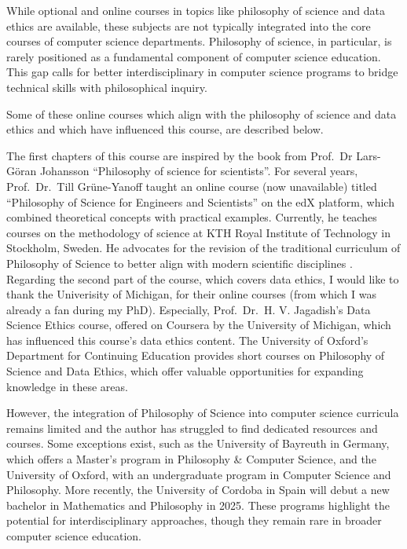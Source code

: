 \documentclass[
  12pt,
]{book}
\begin{document}
While optional and online courses in topics like philosophy of science and data ethics are available, these subjects are not typically integrated into the core courses of computer science departments. Philosophy of science, in particular, is rarely positioned as a fundamental component of computer science education. This gap calls for better interdisciplinary in computer science programs to bridge technical skills with philosophical inquiry.

Some of these online courses which align with the philosophy of science and data ethics and which have influenced this course, are described below.

The first chapters of this course are inspired by the book from Prof.~Dr Lars-Göran Johansson \citep{johansson2016philosophy} ``Philosophy of science for scientists''. For several years, Prof.~Dr.~Till Grüne-Yanoff taught an online course (now unavailable) titled ``Philosophy of Science for Engineers and Scientists'' on the edX platform, which combined theoretical concepts with practical examples. Currently, he teaches courses on the methodology of science at KTH Royal Institute of Technology in Stockholm, Sweden. He advocates for the revision of the traditional curriculum of Philosophy of Science to better align with modern scientific disciplines \citep{grune2014teaching}. Regarding the second part of the course, which covers data ethics, I would like to thank the Univerisity of Michigan, for their online courses (from which I was already a fan during my PhD). Especially, Prof.~Dr.~H. V. Jagadish's Data Science Ethics course, offered on Coursera by the University of Michigan, which has influenced this course's data ethics content. The University of Oxford's Department for Continuing Education provides short courses on Philosophy of Science and Data Ethics, which offer valuable opportunities for expanding knowledge in these areas.

However, the integration of Philosophy of Science into computer science curricula remains limited and the author has struggled to find dedicated resources and courses. Some exceptions exist, such as the University of Bayreuth in Germany, which offers a Master's program in Philosophy \& Computer Science, and the University of Oxford, with an undergraduate program in Computer Science and Philosophy. More recently, the University of Cordoba in Spain will debut a new bachelor in Mathematics and Philosophy in 2025. These programs highlight the potential for interdisciplinary approaches, though they remain rare in broader computer science education.
\end{document}
